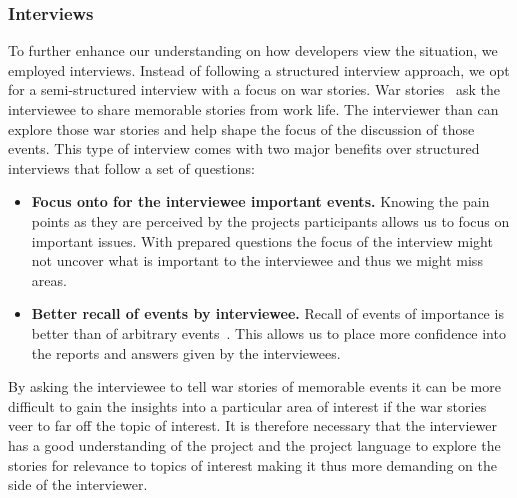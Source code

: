 \subsubsection{Interviews}
To further enhance our understanding on how developers view the situation, we employed interviews.
Instead of following a structured interview approach, we opt for a semi-structured interview with a focus on war stories.
War stories~\cite{lutters:ist:2007} ask the interviewee to share memorable stories from work life.
The interviewer than can explore those war stories and help shape the focus of the discussion of those events.
This type of interview comes with two major benefits over structured interviews that follow a set of questions:

\begin{itemize}
\item\textbf{Focus onto for the interviewee important events.}
Knowing the pain points as they are perceived by the projects participants allows us to focus on important issues.
With prepared questions the focus of the interview might not uncover what is important to the interviewee and thus we might miss areas.
\item\textbf{Better recall of events by interviewee.}
Recall of events of importance is better than of arbitrary events~\cite{lutters:ist:2007}.
This allows us to place more confidence into the reports and answers given by the interviewees.
\end{itemize}

By asking the interviewee to tell war stories of memorable events it can be more difficult to gain the insights into a particular area of interest if the war stories veer to far off the topic of interest.
It is therefore necessary that the interviewer has a good understanding of the project and the project language to explore the stories for relevance to topics of interest making it thus more demanding on the side of the interviewer.











